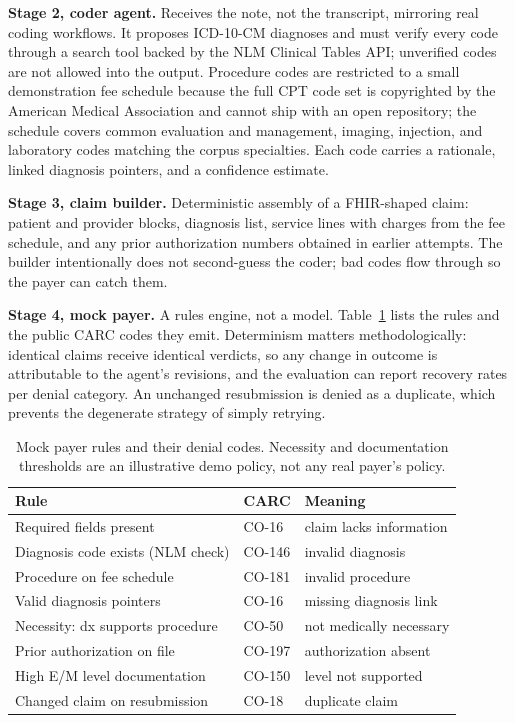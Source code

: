\documentclass[sigconf,nonacm]{acmart}
\begin{document}
\textbf{Stage 2, coder agent.} Receives the note, not the transcript,
mirroring real coding workflows. It proposes ICD-10-CM diagnoses and must
verify every code through a search tool backed by the NLM Clinical Tables
API; unverified codes are not allowed into the output. Procedure codes are
restricted to a small demonstration fee schedule because the full CPT code
set is copyrighted by the American Medical Association and cannot ship with
an open repository; the schedule covers common evaluation and management,
imaging, injection, and laboratory codes matching the corpus specialties.
Each code carries a rationale, linked diagnosis pointers, and a confidence
estimate.

\textbf{Stage 3, claim builder.} Deterministic assembly of a FHIR-shaped
claim: patient and provider blocks, diagnosis list, service lines with
charges from the fee schedule, and any prior authorization numbers obtained
in earlier attempts. The builder intentionally does not second-guess the
coder; bad codes flow through so the payer can catch them.

\textbf{Stage 4, mock payer.} A rules engine, not a model. Table~\ref{tab:rules}
lists the rules and the public CARC codes they emit. Determinism matters
methodologically: identical claims receive identical verdicts, so any change
in outcome is attributable to the agent's revisions, and the evaluation can
report recovery rates per denial category. An unchanged resubmission is
denied as a duplicate, which prevents the degenerate strategy of simply
retrying.

\begin{table}
  \caption{Mock payer rules and their denial codes. Necessity and
  documentation thresholds are an illustrative demo policy, not any real
  payer's policy.}
  \label{tab:rules}
  \begin{tabular}{lll}
    \toprule
    Rule & CARC & Meaning \\
    \midrule
    Required fields present & CO-16 & claim lacks information \\
    Diagnosis code exists (NLM check) & CO-146 & invalid diagnosis \\
    Procedure on fee schedule & CO-181 & invalid procedure \\
    Valid diagnosis pointers & CO-16 & missing diagnosis link \\
    Necessity: dx supports procedure & CO-50 & not medically necessary \\
    Prior authorization on file & CO-197 & authorization absent \\
    High E/M level documentation & CO-150 & level not supported \\
    Changed claim on resubmission & CO-18 & duplicate claim \\
    \bottomrule
  \end{tabular}
\end{table}
\end{document}
